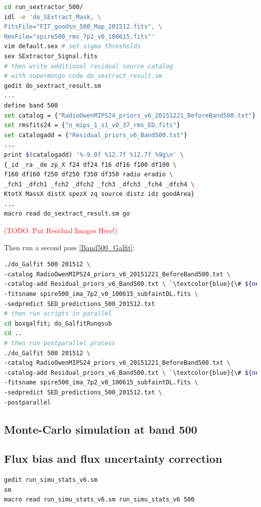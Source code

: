 \documentclass[11pt,a4paper]{article}
\begin{document}
\begin{lstlisting}[language=bash]
cd run_sextractor_500/
idl -e 'do_SExtract_Mask, \
FitsFile="FIT_goodsn_500_Map_201512.fits", \
RmsFile="spire500_rms_7p2_v0_100615.fits"'
vim default.sex # set sigma thresholds
sex SExtractor_Signal.fits
# then write additional residual source catalog
# with supermongo code do_sextract_result.sm
gedit do_sextract_result.sm
...
define band 500
set catalog = {"RadioOwenMIPS24_priors_v6_20151221_BeforeBand500.txt"}
set rmsfits24 = {"n_mips_1_s1_v0_37_rms_ED.fits"}
set catalogadd = {"Residual_priors_v6_Band500.txt"}
...
print $(catalogadd) '%-9.0f %12.7f %12.7f %9g\n' \
{_id _ra _de zp_X f24 df24 f16 df16 f100 df100 \
f160 df160 f250 df250 f350 df350 radio eradio \
_fch1 _dfch1 _fch2 _dfch2 _fch3 _dfch3 _fch4 _dfch4 \
KtotX MassX distX spezX zq source distz idz goodArea}
...
macro read do_sextract_result.sm go
\end{lstlisting}

\textcolor{red}{(TODO: Put Residual Images Here!)}

Then run a second pass \ref{Band500_Galfit}: 

\begin{lstlisting}[language=bash]
./do_Galfit 500 201512 \
-catalog RadioOwenMIPS24_priors_v6_20151221_BeforeBand500.txt \
-catalog-add Residual_priors_v6_Band500.txt \ `\textcolor{blue}{\# ${new!}$}`
-fitsname spire500_ima_7p2_v0_100615_subfaintDL.fits \
-sedpredict SED_predictions_500_201512.txt
# then run scripts in parallel 
cd boxgalfit; do_GalfitRunqsub
cd ..
# then run postparallel process
./do_Galfit 500 201512 \
-catalog RadioOwenMIPS24_priors_v6_20151221_BeforeBand500.txt \
-catalog-add Residual_priors_v6_Band500.txt \ `\textcolor{blue}{\# ${new!}$}`
-fitsname spire500_ima_7p2_v0_100615_subfaintDL.fits \
-sedpredict SED_predictions_500_201512.txt \
-postparallel
\end{lstlisting}

\subsection{Monte-Carlo simulation at band 500}
\label{Band500_Galsim}

\subsection{Flux bias and flux uncertainty correction}
\label{Band500_dfcorr}

\begin{lstlisting}[language=bash]
gedit run_simu_stats_v6.sm
sm
macro read run_simu_stats_v6.sm run_simu_stats_v6 500
\end{lstlisting}
\end{document}
